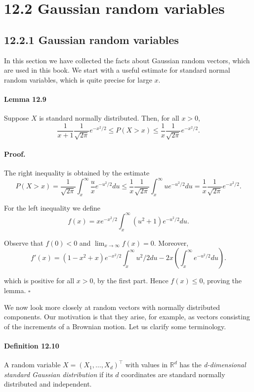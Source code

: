 \documentclass{article}
\begin{document}
\section*{12.2 Gaussian random variables}

\subsection*{12.2.1 Gaussian random variables}

In this section we have collected the facts about Gaussian random vectors, which are used in this book. We start with a useful estimate for standard normal random variables, which is quite precise for large $x$.

\paragraph{Lemma 12.9} Suppose $X$ is standard normally distributed. Then, for all $x > 0$,
\[
\frac{1}{x + 1} \frac{1}{\sqrt{2\pi}} e^{-x^2/2} \leq P(X > x) \leq \frac{1}{x} \frac{1}{\sqrt{2\pi}} e^{-x^2/2}.
\]

\paragraph{Proof.} The right inequality is obtained by the estimate
\[
P(X > x) = \frac{1}{\sqrt{2\pi}} \int_x^{\infty} \frac{u}{x} e^{-u^2/2} du \leq \frac{1}{x} \frac{1}{\sqrt{2\pi}} \int_x^{\infty} u e^{-u^2/2} du = \frac{1}{x} \frac{1}{\sqrt{2\pi}} e^{-x^2/2}.
\]

For the left inequality we define
\[
f(x) = x e^{-x^2/2} \int_x^{\infty} \left( u^2 + 1 \right) e^{-u^2/2} du.
\]

Observe that $f(0) < 0$ and $\lim_{x \to \infty} f(x) = 0$. Moreover,
\[
f'(x) = (1 - x^2 + x) e^{-x^2/2} \int_x^{\infty} u^2/2 du - 2x \left(\int_x^{\infty} e^{-u^2/2} du\right).
\]

which is positive for all $x > 0$, by the first part. Hence $f(x) \leq 0$, proving the lemma. \hfill $\square$

We now look more closely at random vectors with normally distributed components. Our motivation is that they arise, for example, as vectors consisting of the increments of a Brownian motion. Let us clarify some terminology.

\paragraph{Definition 12.10} A random variable $X = (X_1, \ldots, X_d)^\top$ with values in $\mathbb{R}^d$ has the \textit{d-dimensional standard Gaussian distribution} if its $d$ coordinates are standard normally distributed and independent.
\end{document}
